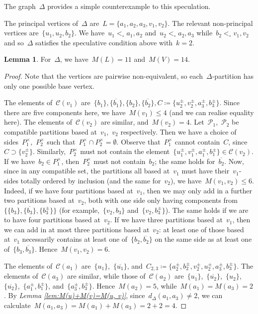\documentclass[11pt]{amsart}
\theoremstyle{definition}
\theoremstyle{definition}
\theoremstyle{definition}
\theoremstyle{definition}
\newtheorem{lemma}[theorem]{Lemma}
\newcommand{\calC}{\mathcal{C}}
\newcommand{\calP}{\mathcal{P}} %
\begin{document}
The graph~$\Delta$ provides a simple counterexample to this speculation.

The principal vertices of~$\Delta$ are~$L = \{a_1, a_2, a_3, v_1, v_2\}$. The relevant non-principal vertices are~$\{u_1, u_2, b_2\}$. We have~$u_1 <_\circ a_1, a_2$ and~$u_2 <_\circ a_2, a_3$ while~$b_2 <_\circ v_1, v_2$ and so~$\Delta$ satisfies the speculative condition above with~$k = 2$.

\begin{lemma}\label{lem:M(L) and M(V) for Delta}
    For~$\Delta$, we have~$M(L) = 11$ and~$M(V) = 14$.
\end{lemma}

\begin{proof}
Note that the vertices are pairwise non-equivalent, so each~$\Delta$-partition has only one possible base vertex.

The elements of~$\calC(v_1)$ are~$\{b_1\}, \{\overline{b_1}\}, \{b_2\}, \{\overline{b_2}\}, C \coloneqq \{u_2^\pm, v_2^\pm, a_3^\pm, b_3^\pm\}$. Since there are five components here, we have~$M(v_1) \leq 4$ (and we can realise equality here). The elements of~$\calC(v_2)$ are similar, and~$M(v_2) = 4$. Let~$\calP_1$,~$\calP_2$ be compatible partitions based at~$v_1$,~$v_2$ respectively. Then we have a choice of sides~$P_1^\times$,~$P_2^\times$ such that~$P_1^\times \cap P_2^\times = \emptyset$. Observe that~$P_1^\times$ cannot contain~$C$, since~$C \supset \{v_2^\pm\}$. Similarly,~$P_2^\times$ must not contain the element~$\{u_1^\pm, v_1^\pm, a_1^\pm, b_1^\pm\} \in \calC(v_2)$. If we have~$b_2 \in P_1^\times$, then~$P_2^\times$ must not contain~$b_2$; the same holds for~$\overline{b_2}$. Now, since in any compatible set, the partitions all based at~$v_1$ must have their~$v_1$-sides totally ordered by inclusion (and the same for~$v_2$), we have~$M(v_1, v_2) \leq 6$. Indeed, if we have four partitions based at~$v_1$, then we may only add in a further two partitions based at~$v_2$, both with one side only having components from~$\{\{b_3\}, \{\overline{b_3}\}, \{b_3^\pm\}\}$ (for example,~$\{v_2, b_3\}$ and~$\{v_2, b_3^\pm\}$). The same holds if we are to have four partitions based at~$v_2$. If we have three partitions based at~$v_1$, then we can add in at most three partitions based at~$v_2$: at least one of those based at~$v_1$ necessarily contains at least one of~$\{b_2, \overline{b_2}\}$ on the same side as at least one of~$\{b_3, \overline{b_3}\}$. Hence~$M(v_1, v_2) = 6$.

The elements of~$\calC(a_1)$ are~$\{u_1\}$,~$\{\overline{u_1}\}$, and~$C_{2, 3} \coloneqq \{a_2^\pm, b_2^\pm, v_2^\pm, u_2^\pm, a_3^\pm, b_3^\pm\}$. The elements of~$\calC(a_3)$ are similar, while those of~$\calC(a_2)$ are~$\{u_1\}$,~$\{\overline{u_2}\}$,~$\{u_2\}$,~$\{\overline{u_2}\}$,~$\{a_1^\pm, b_1^\pm\}$, and~$\{a_3^\pm, b_3^\pm\}$. Hence~$M(a_2) = 5$, while~$M(a_1) = M(a_3) = 2$. By \textit{Lemma \ref{lem:M(u)+M(v)=M(u, v)}}, since~$d_\Delta(a_1, a_3) \neq 2$, we can calculate~$M(a_1, a_3) = M(a_1) + M(a_3) = 2+2 = 4$. 


\end{proof}
\end{document}
